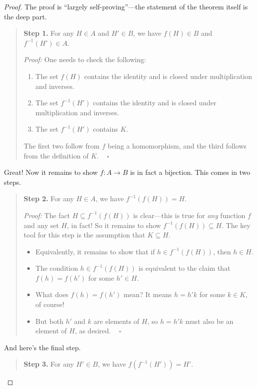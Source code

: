 \begin{proof}
    The proof is ``largely self-proving''---the statement of the theorem itself is the deep part.
    \begin{quote}
        \textbf{Step 1.} For any $H \in A$ and $H' \in B$, we have $f(H) \in B$ and $f^{-1}(H') \in A$.

        \emph{Proof:} One needs to check the following:
        \begin{enumerate}
            \item The set $f(H)$ contains the identity and is closed under multiplication and inverses.
            \item The set $f^{-1}(H')$ contains the identity and is closed under multiplication and inverses.
            \item The set $f^{-1}(H')$ contains $K$.
        \end{enumerate}
        The first two follow from $f$ being a homomorphism, and the third follows from the definition of $K$. ~ $\square$
    \end{quote}
    Great!  Now it remains to show $f: A \to B$ is in fact a bijection.  This comes in two steps.
    \begin{quote}
        \textbf{Step 2.} For any $H \in A$, we have $f^{-1}(f(H)) = H$.

        \emph{Proof:} The fact $H \subseteq f^{-1}(f(H))$ is clear---this is true for \emph{any} function $f$ and any set $H$, in fact!  So it remains to show $f^{-1}(f(H)) \subseteq H$.  The key tool for this step is the assumption that $K \subseteq H$.
        \begin{itemize}
            \item Equivalently, it remains to show that if $h \in f^{-1}(f(H))$, then $h \in H$.
            \item The condition $h \in f^{-1}(f(H))$ is equivalent to the claim that $f(h) = f(h')$ for some $h' \in H$.
            \item What does $f(h) = f(h')$ mean?  It means $h = h'k$ for some $k \in K$, of course!
            \item But both $h'$ and $k$ are elements of $H$, so $h = h'k$ must also be an element of $H$, as desired. ~ $\square$
        \end{itemize}
    \end{quote}
    And here's the final step.
    \begin{quote}
        \textbf{Step 3.} For any $H' \in B$, we have $f(f^{-1}(H')) = H'$.


\end{quote}
\end{proof}
